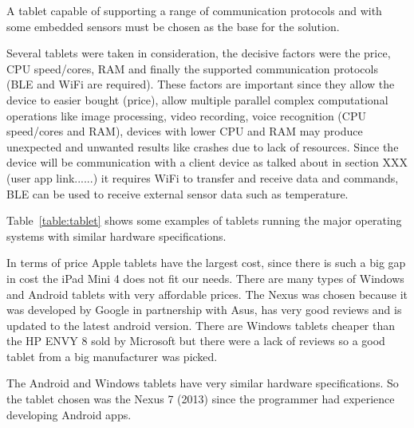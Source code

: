 A tablet capable of supporting a range of communication protocols and with some embedded sensors must be chosen as the base for the solution.

Several tablets were taken in consideration, the decisive factors were the price, \ac{CPU} speed/cores, \ac{RAM} and finally the supported communication protocols (\ac{BLE} and \ac{WiFi} are required). These factors are important since they allow the device to easier bought (price), allow multiple parallel complex computational operations like image processing, video recording, voice recognition (\ac{CPU} speed/cores and \ac{RAM}), devices with lower \ac{CPU} and \ac{RAM} may produce unexpected and unwanted results like crashes due to lack of resources. Since the device will be communication with a client device as talked about in section XXX (user app link......) it requires \ac{WiFi} to transfer and receive data and commands, \ac{BLE} can be used to receive external sensor data such as temperature.


Table~\ref{table:tablet} shows some examples of tablets running the major operating systems with similar hardware specifications.

In terms of price Apple tablets have the largest cost, since there is such a big gap in cost the iPad Mini 4 does not fit our needs. There are many types of Windows and Android tablets with very affordable prices. The Nexus was chosen because it was developed by Google in partnership with Asus, has very good reviews and is updated to the latest android version. There are Windows tablets cheaper than the HP ENVY 8 sold by Microsoft but there were a lack of reviews so a good tablet from a big manufacturer was picked.

The Android and Windows tablets have very similar hardware specifications. So the tablet chosen was the Nexus 7 (2013) since the programmer had experience developing Android apps.


